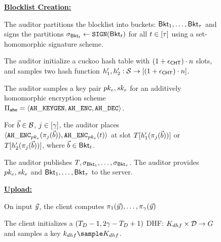 \iffalse 
\begin{figure}[th!]
\footnotesize
	\begin{mdframed}
\noindent\textbf{\underline{Blocklist Creation:}}

\enumListStart
\item The auditor partitions the blocklist into \numBuckets buckets: $\mathsf{Bkt}_{1}, \dots, \mathsf{Bkt}_{\tau}$ and signs the partitions $\genericSig[\bucket{\bucketIdx}] \assign \signingAlg(\bucket{\bucketIdx})$ for all $\bucketIdx \in \nats[\numBuckets]$ using a set-homomorphic signature scheme. 




\item\label{fuzzy:pre:cht1} The auditor initialize a cuckoo hash table \cuckooTable with $(1 + \epsilon_{\mathsf{CHT}}) \cdot n$ slots, and samples two hash function $\cuckooHashFn{1}, \cuckooHashFn{2}: \projectedSpace \rightarrow \nats[(1 + \cuckooTableParam) \cdot \blocklistSize]$. 

\item\label{fuzzy:pre:cht2} The auditor samples a key pair $\encryptPubKey, \encryptPrivKey$ for an additively homomorphic encryption scheme $\ahencryptionSchemeDefn$. 


\item\label{fuzzy:pre:cht3} For $\blocklistVec \in \blocklist$, $\projIdx \in \nats[\numProjections]$, the auditor places $\langle \ahencrypt[\encryptPubKey](\projFn[\projIdx](\blocklistVec)),\ahencrypt[\encryptPubKey](\bucketIdx) \rangle$ at slot $\cuckooTable[\cuckooHashFn{1}(\projFn[\projIdx](\blocklistVec))]$ or $\cuckooTable[\cuckooHashFn{2}(\projFn[\projIdx](\blocklistVec))]$, where $\blocklistVec \in \bucket{\bucketIdx}$. 



\item The auditor publishes $\cuckooTable, \genericSig[\bucket{1}], \dots, \genericSig[\bucket{\numBuckets}]$. The auditor provides $\encryptPubKey, \encryptPrivKey$ and $\mathsf{Bkt}_{1}, \dots, \mathsf{Bkt}_{\tau}$ to the server. 

\enumListEnd

\noindent\textbf{\underline{Upload:}}
\enumListStartResume
\item On input $\clientVec$, the client computes $\projFn[1](\clientVec), \dots, \projFn[\numProjections](\clientVec)$

\item The client initializes a $(T_{D} -1, 2\gamma - T_{D} + 1)$ DHF: $K_{dhf} \times \mathcal{D} \rightarrow G$ and samples a key $\dhfKey \sample \dhfKeySpace$. 


\end{mdframed}
\end{figure}
